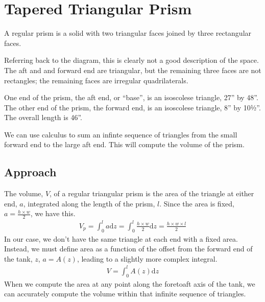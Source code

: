 \documentclass[letterpaper,10pt,english]{sphinxmanual}
\begin{document}
\chapter{Tapered Triangular Prism}
\label{\detokenize{prism-irregular:tapered-triangular-prism}}\label{\detokenize{prism-irregular::doc}}
\sphinxAtStartPar
A regular prism is a solid with two triangular faces joined by three rectangular faces.

\sphinxAtStartPar
Referring back to the diagram, this is clearly not a good description of the space. The aft and and forward end are triangular, but the remaining three faces are not rectangles; the remaining faces are irregular quadrilaterals.

\sphinxAtStartPar
One end of the prism, the aft end, or “base”, is an isoscolese triangle, 27” by 48”.
The other end of the prism, the forward end, is an isoscolese triangle, 8” by 10½”.
The overall length is 46”.

\sphinxAtStartPar
We can use calculus to sum an infinte sequence of triangles from the small forward end to the large aft end. This will compute the volume of the prism.

\begin{sphinxVerbatim}[commandchars=\\\{\}]
   
   
\end{sphinxVerbatim}


\section{Approach}
\label{\detokenize{prism-irregular:approach}}
\sphinxAtStartPar
The volume, \(V\), of a regular triangular prism is the area of the triangle at either end, \(a\), integrated along the length of the prism, \(l\).
Since the area is fixed, \(a = \frac{h \times w}{2}\), we have this.
\begin{equation*}
\begin{split}
V_p = \int_0^l a \text{d}z = \int_{0}^{l} \frac{{h \times w}}{{2}} \text{d}z = \frac{h \times w \times l}{2}
\end{split}
\end{equation*}
\sphinxAtStartPar
In our case, we don’t have the same triangle at each end with a fixed area. Instead, we must define area as a function of the offset from the forward end of the tank, \(z\), \(a = A(z)\), leading to a slightly more complex integral.
\begin{equation*}
\begin{split}
V = \int_0^l A(z) \text{d}z
\end{split}
\end{equation*}
\sphinxAtStartPar
When we compute the area at any point along the fore\sphinxhyphen{}to\sphinxhyphen{}aft axis of the tank, we can accurately compute the volume within that infinite sequence of triangles.
\end{document}

